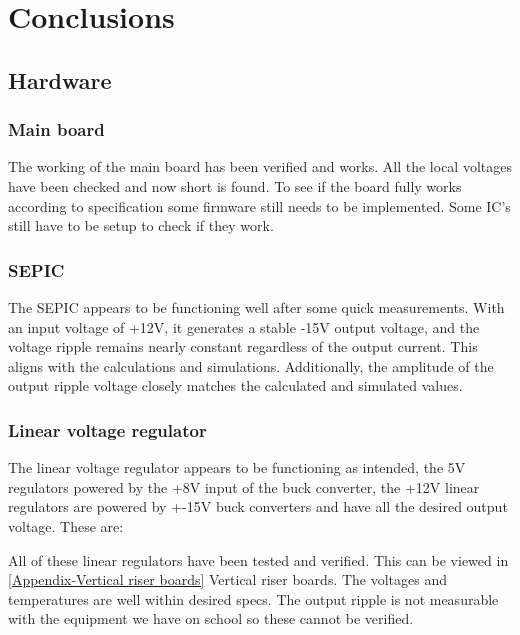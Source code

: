 \section{Conclusions}
\subsection{Hardware}

\subsubsection{Main board}
The working of the main board has been verified and works. All the local voltages have been checked and now short is found. To see if the board fully works according to specification some firmware still needs to be implemented. Some IC's still have to be setup to check if they work.
\subsubsection{SEPIC}
The SEPIC appears to be functioning well after some quick measurements. With an input voltage of +12V, it generates a stable -15V output voltage, and the voltage ripple remains nearly constant regardless of the output current. This aligns with the calculations and simulations. Additionally, the amplitude of the output ripple voltage closely matches the calculated and simulated values.

\subsubsection{Linear voltage regulator}
The linear voltage regulator appears to be functioning as intended, the 5V regulators powered by the +8V input of the buck converter, the +12V linear regulators are powered by +-15V buck converters and have all the desired output voltage. These are:
 
All of these linear regulators have been tested and verified. This can be viewed in \ref{Appendix-Vertical riser boards} Vertical riser boards. The voltages and temperatures are well within desired specs. The output ripple is not measurable with the equipment we have on school so these cannot be verified.

